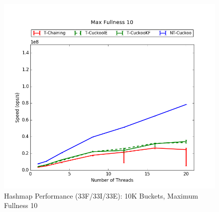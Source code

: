 \begin{figure}[H]
    \centering
	\begin{minipage}{0.5\textwidth}\includegraphics[width=\textwidth]{maps/10HM10K:F34,I33,E33.png} 
    \end{minipage}
	\begin{minipage}{0.4\textwidth}
    
    \end{minipage}
    \caption{Hashmap Performance (33F/33I/33E): 10K Buckets, Maximum Fullness 10}
\end{figure}

